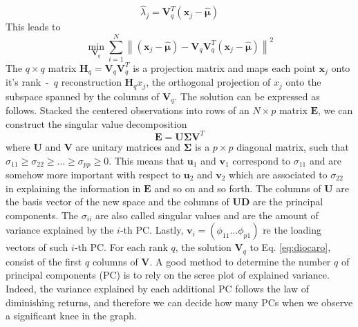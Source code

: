 \begin{equation}
    \hat{\lambda}_j = \mathbf{V}_q^{T}(\mathbf{x}_j-\hat{\bm{\mu}})
\end{equation}
This leads to 
\begin{equation}
\label{eq:diocaro}
    \min _{\mathbf{V}_q} \sum_{i=1}^N\left\|\left(\mathbf{x}_j-\hat{\bm{\mu}}\right)-\mathbf{V}_q \mathbf{V}_q^T\left(\mathbf{x}_j-\hat{\bm{\mu}}\right)\right\|^2
\end{equation}
The $q \times q$ matrix $\mathbf{H}_q=\mathbf{V}_q\mathbf{V}_q^T$ is a projection matrix and maps each point $\mathbf{x}_j$ onto it's rank~-~$q$ reconstruction $\mathbf{H}_qx_j$, the orthogonal projection of $x_j$ onto the subspace spanned by the columns of $\mathbf{V}_q$. The solution can be expressed as follows. Stacked the centered observations into rows of an $N\times p$ matrix $\mathbf{E}$, we can construct the singular value decomposition
\begin{equation}
    \label{eq:SVD}
    \mathbf{E}=\mathbf{U}\bm{\Sigma}\mathbf{V}^T
\end{equation}
where $\mathbf{U}$ and $\mathbf{V}$ are unitary matrices and $\bm{\Sigma}$ is a $p \times p$ diagonal matrix, such that $\sigma_{11}\ge \sigma_{22} \ge \dots \ge \sigma_{pp}\ge 0$. This means that $\mathbf{u}_1$ and $\mathbf{v}_1$ correspond to $\sigma_{11}$ and are somehow more important with respect to $\mathbf{u}_2$ and $\mathbf{v}_2$ which are associated to $\sigma_{22}$ in explaining the information in $\mathbf{E}$ and so on and so forth. The columns of $\mathbf{U}$ are the basis vector of the new space and the columns of $\mathbf{U}\mathbf{D}$ are the principal components. The $\sigma_{ii}$ are also called singular values and are the amount of variance explained by the $i$-th PC. Lastly, $\mathbf{v}_i=(\phi_{11} \dots \phi_{p1})$ re the loading vectors of such $i$-th PC.  For each rank $q$, the solution $\mathbf{V}_q$ to Eq. \ref{eq:diocaro}, consist of the first $q$ columns of $\mathbf{V}$. A good method to determine the number $q$ of principal components (PC) is to rely on the scree plot of explained variance. Indeed, the variance explained by each additional PC follows the law of diminishing returns, and therefore we can decide how many PCs when we observe a significant knee in the graph.

